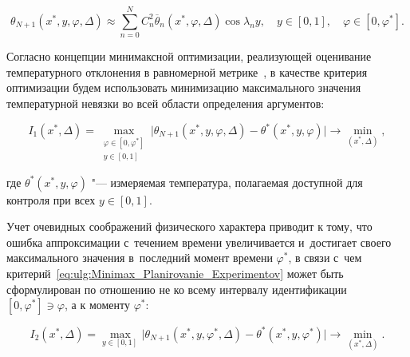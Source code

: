 \begin{equation}\label{eq:ulg:Temperature_Planirovanie_Experimentov}

\theta _{N + 1}( x^*,y,\varphi ,\Delta  ) \approx \sum\limits_{n = 0}^N {C_n^2{{\overline \theta  }_n} ( x^*,\varphi ,\Delta  )}  \cos \lambda_ny,\quad y \in [ 0,1 ], \quad \varphi  \in [ 0,\varphi ^* ] .    

\end{equation}



Согласно концепции минимаксной оптимизации, реализующей оценивание температурного отклонения в равномерной метрике~\cite{ulg:bib:Rapoport}, в качестве критерия оптимизации будем использовать минимизацию максимального значения температурной невязки во всей области определения аргументов:

\begin{equation}\label{eq:ulg:Minimax_Planirovanie_Experimentov}

{I_1}( x^*,\Delta ) = 

\max \limits_{\substack{

\varphi  \in [ 0, \varphi ^*]\\

y \in [0,1]}}

 \bigl| \theta _{N + 1} (x^*,y,\varphi ,\Delta ) - 

 \theta ^* (x^*,y,\varphi ) \bigr| \to \min _{( x^*,\Delta )} ,

\end{equation}

\noindent

где  $\theta ^*(x^*,y,\varphi )$ "--- измеряемая температура, полагаемая доступной для контроля при всех $  y \in [ 0, 1]  $.



Учет очевидных соображений физического характера приводит к тому, что ошибка аппроксимации с~течением времени увеличивается и~достигает своего максимального значения в~последний момент времени  $ \varphi ^*  $, в связи с~чем критерий~\eqref{eq:ulg:Minimax_Planirovanie_Experimentov} может быть сформулирован по отношению не ко всему интервалу идентификации  $[ 0,\varphi ^* ] \ni \varphi $, а к моменту  $ \varphi ^*  $:

\begin{equation}\label{eq:ulg:Minimax_Planirovanie_Experimentov_END}

{I_2}(x^*,\Delta ) = 

\max \limits_{y \in [0,1]\,} 

\bigl| \theta _{N + 1}( x^*,y,\varphi ^*,\Delta ) - 

\theta ^*(x^*,y,\varphi ^*) \bigr| \to \min _{( x^*,\Delta  )} .    

\end{equation}



